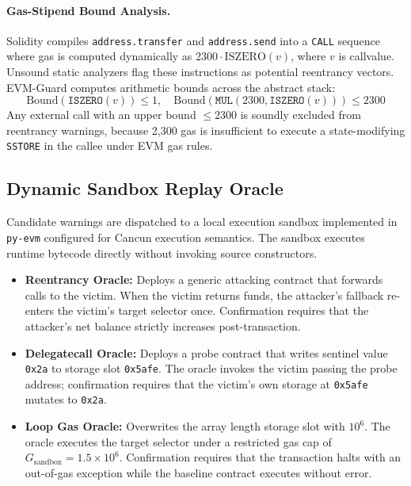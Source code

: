 \documentclass[pdflatex,sn-mathphys]{sn-jnl}
\theoremstyle{thmstyleone}
\theoremstyle{thmstyletwo}
\begin{document}
\paragraph{Gas-Stipend Bound Analysis.} Solidity compiles \texttt{address.transfer} and \texttt{address.send} into a \texttt{CALL} sequence where gas is computed dynamically as $2300 \cdot \mathrm{ISZERO}(v)$, where $v$ is callvalue. Unsound static analyzers flag these instructions as potential reentrancy vectors. EVM-Guard computes arithmetic bounds across the abstract stack:
\begin{equation}
    \mathrm{Bound}(\mathtt{ISZERO}(v)) \le 1, \quad \mathrm{Bound}(\mathtt{MUL}(2300, \mathtt{ISZERO}(v))) \le 2300
\end{equation}
Any external call with an upper bound $\le 2300$ is soundly excluded from reentrancy warnings, because 2,300 gas is insufficient to execute a state-modifying \texttt{SSTORE} in the callee under EVM gas rules.

\subsection{Dynamic Sandbox Replay Oracle}\label{sec:arch:oracle}

Candidate warnings are dispatched to a local execution sandbox implemented in \texttt{py-evm} configured for Cancun execution semantics. The sandbox executes runtime bytecode directly without invoking source constructors.

\begin{itemize}
    \item \textbf{Reentrancy Oracle:} Deploys a generic attacking contract that forwards calls to the victim. When the victim returns funds, the attacker's fallback re-enters the victim's target selector once. Confirmation requires that the attacker's net balance strictly increases post-transaction.
    \item \textbf{Delegatecall Oracle:} Deploys a probe contract that writes sentinel value \texttt{0x2a} to storage slot \texttt{0x5afe}. The oracle invokes the victim passing the probe address; confirmation requires that the victim's own storage at \texttt{0x5afe} mutates to \texttt{0x2a}.
    \item \textbf{Loop Gas Oracle:} Overwrites the array length storage slot with $10^6$. The oracle executes the target selector under a restricted gas cap of $G_{\mathrm{sandbox}} = 1.5 \times 10^6$. Confirmation requires that the transaction halts with an out-of-gas exception while the baseline contract executes without error.
\end{itemize}
\end{document}
